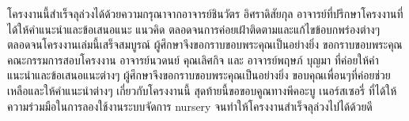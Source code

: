 \iffalse
\begin{dedication}
This document is dedicated to all Chiang Mai University students.

Dedication page is optional.
\end{dedication}
\fi %

\begin{acknowledgments}
โครงงานนี้สำเร็จลุล่วงได้ด้วยความกรุณาจากอาจารย์ชินวัตร อิศราดิสัยกุล อาจารย์ที่ปรึกษาโครงงานที่ได้ให้คำแนะนำและข้อเสนอแนะ แนวคิด ตลอดจนการค่อยเฝ้าติดตามและแก้ไขข้อบกพร่องต่างๆ ตลอดจนโครงงานเล่มนี้เสร็จสมบูรณ์
ผู้ศึกษาจึงขอกราบขอบพระคุณเป็นอย่างยิ่ง
ขอกราบขอบพระคุณคณะกรรมการสอบโครงงาน อาจารย์นวดนย์ คุณเลิศกิจ และ อาจารย์พฤษภ์ บุญมา ที่ค่อยให้คำแนะนำและข้อเสนอแนะต่างๆ ผู้ศึกษาจึงขอกราบขอบพระคุณเป็นอย่างยิ่ง
ขอบคุณเพื่อนๆที่ค่อยช่วยเหลือและให้คำแนะนำต่างๆ เกี่ยวกับโครงงานนี้
สุดท้ายนี้ขอขอบคูณทางพีคอะบู เนอร์สเซอรี่ ที่ได้ให้ความร่วมมือในการลองใช้งานระบบจัดการ nursery จนทำให้โครงงานสำเร็จลุล่วงไปได้ด้วยดี

\end{acknowledgments}%
\fi %

\contentspage

\ifproject
\figurelistpage

\tablelistpage
\fi %



